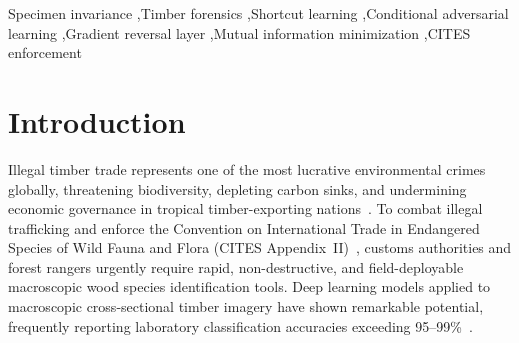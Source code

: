 \documentclass[a4paper,fleqn]{cas-sc}
\begin{document}
\begin{keywords}
Specimen invariance \sep Timber forensics \sep Shortcut learning \sep Conditional adversarial learning \sep Gradient reversal layer \sep Mutual information minimization \sep CITES enforcement
\end{keywords}

\maketitle

\section{Introduction}
\label{sec:intro}

Illegal timber trade represents one of the most lucrative environmental crimes globally, threatening biodiversity, depleting carbon sinks, and undermining economic governance in tropical timber-exporting nations~\cite{dormontt2015,song2025,liu2025}. To combat illegal trafficking and enforce the Convention on International Trade in Endangered Species of Wild Fauna and Flora (CITES Appendix~II)~\cite{cites}, customs authorities and forest rangers urgently require rapid, non-destructive, and field-deployable macroscopic wood species identification tools. Deep learning models applied to macroscopic cross-sectional timber imagery have shown remarkable potential, frequently reporting laboratory classification accuracies exceeding 95--99\%~\cite{fabijanska2021,wu2021,song2025}.
\end{document}
